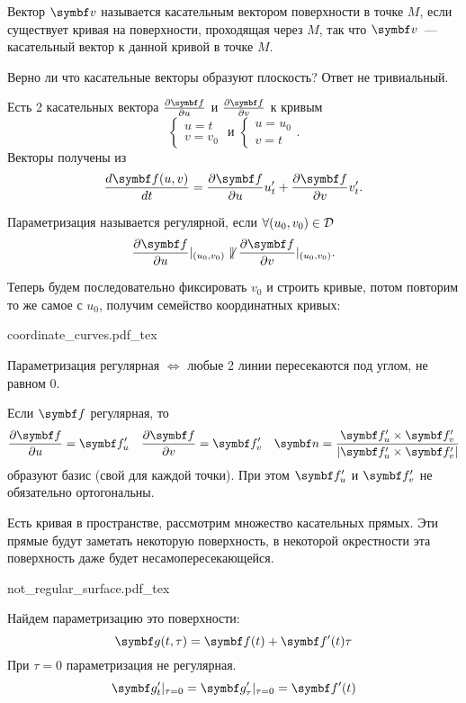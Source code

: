 \documentclass[main]{subfiles}
\begin{document}
\begin{definition}
    Вектор $\vv$ называется касательным вектором поверхности в точке $M$,
    если существует кривая на поверхности, проходящая через $M$, так что
    $\vv$~--- касательный вектор к данной кривой в точке $M$.
\end{definition}

Верно ли что касательные векторы образуют плоскость? Ответ не тривиальный.

Есть 2 касательных вектора
$\frac{\partial \vf}{\partial u}$ и $\frac{\partial \vf}{\partial v}$ к кривым
\[\begin{cases}
        u = t \\
        v = v_0
    \end{cases}
    \text{ и }
    \begin{cases}
        u = u_0 \\
        v = t
    \end{cases}.\]
Векторы получены из
\[\frac{d\vf(u,v)}{dt} = \frac{\partial\vf}{\partial u} u_t' + \frac{\partial\vf}{\partial v} v_t'.\]

\begin{definition}
    Параметризация называется регулярной, если $\forall (u_0, v_0) \in \mathcal{D}$
    \[\frac{\partial\vf}{\partial u}|_{(u_0, v_0)}
        \not\parallel
        \frac{\partial\vf}{\partial v}|_{(u_0, v_0)}.\]
\end{definition}
Теперь будем последовательно фиксировать $v_0$ и строить кривые,
потом повторим то же самое с $u_0$, получим семейство координатных кривых:
\begin{center}
    {coordinate_curves.pdf_tex}
\end{center}
Параметризация регулярная $\Leftrightarrow$ любые 2 линии пересекаются под углом, не равном 0.

Если $\vf$ регулярная, то
\[
    \frac{\partial \vf}{\partial u} = \vf'_u \quad
    \frac{\partial \vf}{\partial v} = \vf'_v \quad
    \vn = \frac{\vf_u' \times \vf_v'}{|\vf_u' \times \vf_v'|}
\]
образуют базис (свой для каждой точки).
При этом $\vf_u'$ и $\vf_v'$ не обязательно ортогональны.

\begin{example}
    Есть кривая в пространстве, рассмотрим множество касательных прямых.
    Эти прямые будут заметать некоторую поверхность, в некоторой окрестности эта поверхность даже будет несамопересекающейся.
    \begin{center}
        {not_regular_surface.pdf_tex}
    \end{center}
    Найдем параметризацию это поверхности:
    \[\vg(t, \tau) = \vf(t) + \vf'(t) \tau\]
    При $\tau = 0$ параметризация не регулярная.
    \[\vg_t' |_{\tau = 0} = \vg_\tau'|_{\tau =0} = \vf'(t)\]
\end{example}
\end{document}
